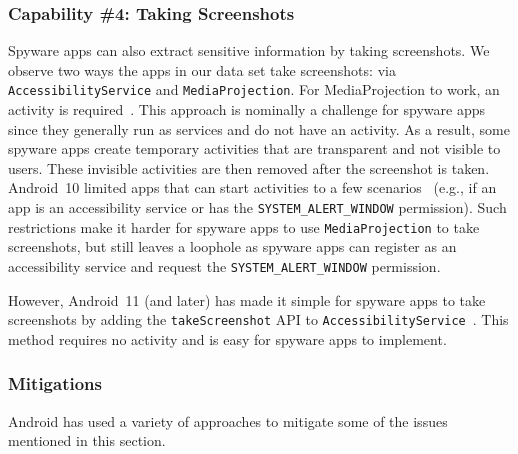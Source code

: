 
\subsubsection*{Capability \#4: Taking Screenshots}
\label{subsubsec:screenshot}
Spyware apps can also extract sensitive information by taking screenshots. We
observe two ways the apps in our data set take screenshots: via
\texttt{AccessibilityService} and \texttt{MediaProjection}. For MediaProjection
to work, an activity is required~\cite{androidH20:online}. This approach is
nominally a challenge for spyware apps since they generally run as services and
do not have an activity. As a result, some spyware apps create temporary
activities that are transparent and not visible to users. These invisible
activities are then removed after the screenshot is taken.  Android~10 limited
apps that can start activities to a few scenarios~\cite{Restrict50:online}
(e.g., if an app is an accessibility service or has the \texttt{SYSTEM\_ALERT\_WINDOW}
permission). Such restrictions make it harder for spyware apps to use
\texttt{MediaProjection} to take screenshots, but still leaves a loophole as spyware apps
can register as an accessibility service and request the \texttt{SYSTEM\_ALERT\_WINDOW}
permission.

However, Android~11 (and later) has made it
simple for spyware apps to take screenshots by adding the
\texttt{takeScreenshot} API to \texttt{AccessibilityService}~\cite{Accessib97:online}.
This method requires no activity and is easy for spyware apps to implement.


\subsubsection{Mitigations}
Android has used a variety of approaches to mitigate some of the issues mentioned in this section.

